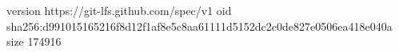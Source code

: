 version https://git-lfs.github.com/spec/v1
oid sha256:d991015165216f8d12f1af8e5c8aa61111d5152dc2c0de827e0506ea418e040a
size 174916
